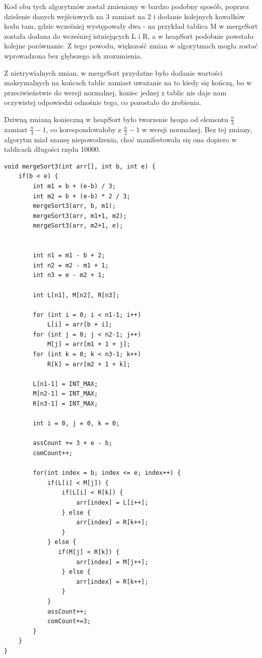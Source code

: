 \documentclass{article}
\begin{document}
Kod obu tych algorytmów został zmieniony w bardzo podobny sposób, poprzez dzielenie danych wejściowych na 3 zamiast na 2 i dodanie kolejnych kawałków kodu tam, gdzie wcześniej występowały dwa - na przykład tablica M w mergeSort została dodana do wcześniej istniejących L i R, a w heapSort podobnie powstało kolejne porównanie. Z tego powodu, większość zmian w algorytmach mogła zostać wprowadzona bez głębszego ich zrozumienia.

Z nietrywialnych zmian, w mergeSort przydatne było dodanie wartości maksymalnych na końcach tablic zamiast uważanie na to kiedy się kończą, bo w przeciwieństwie do wersji normalnej, koniec jednej z tablic nie daje nam oczywistej odpowiedzi odnośnie tego, co pozostało do zrobienia.

Dziwną zmianą konieczną w heapSort było tworzenie heapa od elementu \(\frac{n}{3}\) zamiast \(\frac{n}{3}-1\), co korespondowałoby z \(\frac{n}{2}-1\) w wersji normalnej. Bez tej zmiany, algorytm miał szansę niepowodzenia, choć manifestowała się ona dopiero w tablicach długości rzędu 10000.

\begin{verbatim}
void mergeSort3(int arr[], int b, int e) {
    if(b < e) {
        int m1 = b + (e-b) / 3;
        int m2 = b + (e-b) * 2 / 3;
        mergeSort3(arr, b, m1);
        mergeSort3(arr, m1+1, m2);
        mergeSort3(arr, m2+1, e);
        
        
        int n1 = m1 - b + 2;
        int n2 = m2 - m1 + 1;
        int n3 = e - m2 + 1;
    
        int L[n1], M[n2], R[n3];
        
        for (int i = 0; i < n1-1; i++)
            L[i] = arr[b + i];
        for (int j = 0; j < n2-1; j++)
            M[j] = arr[m1 + 1 + j];
        for (int k = 0; k < n3-1; k++)
            R[k] = arr[m2 + 1 + k];
        
        L[n1-1] = INT_MAX;
        M[n2-1] = INT_MAX;
        R[n3-1] = INT_MAX;
        
        int i = 0, j = 0, k = 0;
        
        assCount += 3 + e - b;
        comCount++;
    
        for(int index = b; index <= e; index++) {
            if(L[i] < M[j]) {
                if(L[i] < R[k]) {
                    arr[index] = L[i++];
                } else {
                    arr[index] = R[k++];
                }
            } else {
               if(M[j] < R[k]) {
                    arr[index] = M[j++];
                } else {
                    arr[index] = R[k++];
                } 
            }
            assCount++;
            comCount+=3;
        }
    }
}
\end{verbatim}
\end{document}
